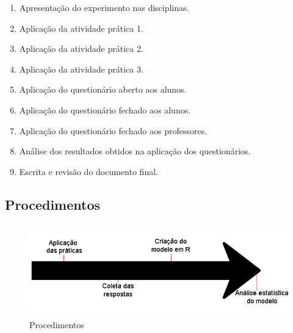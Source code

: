     \begin{enumerate}\setlength\itemsep{0.5em}
        \item Apresentação do experimento nas disciplinas.
        \item Aplicação da atividade prática 1.
        \item Aplicação da atividade prática 2.
        \item Aplicação da atividade prática 3.
        \item Aplicação do questionário aberto aos alunos.
        \item Aplicação do questionário fechado aos alunos.
        \item Aplicação do questionário fechado aos professores.
        \item Análise dos resultados obtidos na aplicação dos questionários.
        \item Escrita e revisão do documento final.
    \end{enumerate}

\subsection{Procedimentos}

\begin{figure}
    \centering
    \includegraphics[width=14cm,height=4cm]{Imagens/Procedimento.png}
    \caption{Procedimentos}
    \label{fig:Procedimento}
\end{figure}

